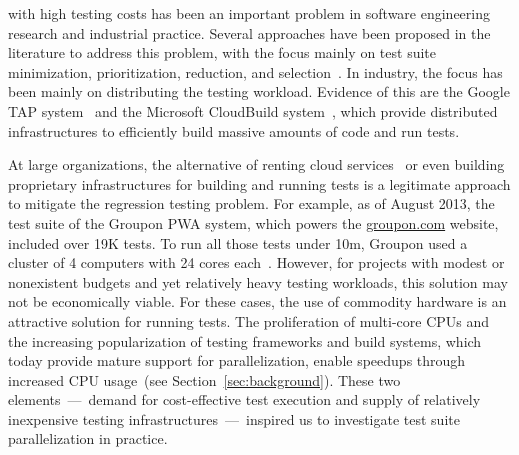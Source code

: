 \documentclass[10pt,journal,compsoc]{IEEEtran}
\begin{document}
\maketitle
\IEEEdisplaynontitleabstractindextext
\IEEEpeerreviewmaketitle


 with high testing costs has been an important
problem in software engineering research and industrial practice.
Several approaches have been proposed in the literature to address
this problem, with the focus mainly on test suite minimization,
prioritization, reduction, and selection~\cite{yoo-harman-stvr2012}.
In industry, the focus has been mainly on distributing the testing
workload.  Evidence of this are the Google TAP
system~\cite{google-tap,google-ci} and the Microsoft CloudBuild
system~\cite{prasad-shulte-ieee-microsoft-ci}, which provide
distributed infrastructures to efficiently build massive amounts of
code and run tests.


At large organizations, the alternative of renting cloud
services~\cite{cloud-services} or even building proprietary
infrastructures for building and running tests is a legitimate
approach to mitigate the regression testing problem.  For example, as
of August 2013, the test suite of the Groupon PWA system, which powers
the \url{groupon.com} website, included over 19K tests.  To run all
those tests under 10m, Groupon used a cluster of 4 computers with 24
cores each~\cite{kim-etal-fse2013}. However, for projects with modest
or nonexistent budgets and yet relatively heavy testing workloads,
this solution may not be economically viable.  For these cases, the
use of commodity hardware is
an attractive solution for running tests.  The proliferation of
multi-core CPUs and the increasing popularization of testing
frameworks and build systems, which today provide mature support for
parallelization, enable speedups through
increased CPU usage~(see Section~\ref{sec:background}).  These two
elements~---~demand for cost-effective test execution and supply of
relatively inexpensive testing infrastructures~---~inspired us to
investigate test suite parallelization in practice.
\end{document}
